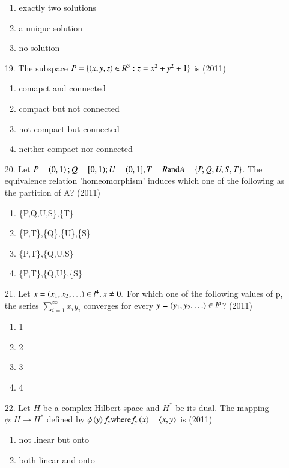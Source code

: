 \documentclass[journal]{IEEEtran}
\begin{document}
\begin{enumerate}
\begin{enumerate}[label=(\Alph*)]
        \item exactly two solutions
        \item a unique solution
        \item no solution
    \end{enumerate}
    \item[19.] The subspace $P = \{\left(x,y,z\right)\in R^3 : z = x^2 + y^2 + 1\}$ is  \hfill (2011)
    \begin{enumerate}[label=(\Alph*)]
        \item comapct and connected
        \item compact but not connected
        \item not compact but connected
        \item neither compact nor connected
    \end{enumerate}
    \item[20.] Let $P = \left(0,1\right); Q=[0,1); U = (0,1], T = R \text{and} A = \{P,Q,U,S,T\}$. The equivalence relation 'homeomorphism' induces which one of the following as the partition of A?   \hfill (2011)
    \begin{enumerate}[label=(\Alph*)]
        \item \{P,Q,U,S\},\{T\}
        \item \{P,T\},\{Q\},\{U\},\{S\}
        \item \{P,T\},\{Q,U,S\}
        \item \{P,T\},\{Q,U\},\{S\}
    \end{enumerate}
    \item[21.] Let $x =\left(x_1, x_2,\ldots\right)\in l^4, x\neq 0.$ For which one of the following values of p, the series $\sum_{i=1}^{\infty}x_iy_i$ converges for every $y=\left(y_1,y_2,\ldots\right)\in l^p$?  \hfill (2011)
    \begin{enumerate}[label=(\Alph*)]
        \item 1
        \item 2
        \item 3
        \item 4
    \end{enumerate} 
    \item[22.] Let $H$ be a complex Hilbert space and $H^*$ be its dual. The mapping $\phi:H\rightarrow H^*$ defined by $\phi\left(y\right)f_y \text{where} f_y\left(x\right) = \langle x,y \rangle$ is   \hfill (2011)
    \begin{enumerate}[label=(\Alph*)]
        \item not linear but onto
        \item both linear and onto

\end{enumerate}
\end{enumerate}
\end{document}
